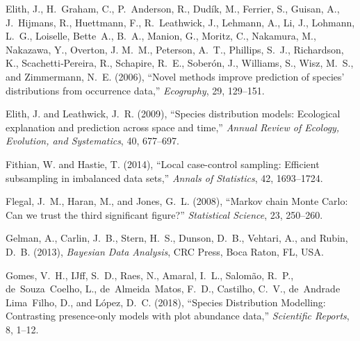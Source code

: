 \documentclass[11pt, titlepage]{article}
\begin{document}
\begin{spacing}{1.9}
\begin{flushleft}
\begin{thebibliography}{59}
Elith, J., H.~Graham, C., P.~Anderson, R., Dudík, M., Ferrier, S., Guisan, A.,
  J.~Hijmans, R., Huettmann, F., R.~Leathwick, J., Lehmann, A., Li, J.,
  Lohmann, L.~G., Loiselle, Bette~A., B.~A., Manion, G., Moritz, C., Nakamura,
  M., Nakazawa, Y., Overton, J. M.~M., Peterson, A.~T., Phillips, S.~J.,
  Richardson, K., Scachetti‐Pereira, R., Schapire, R.~E., Soberón, J.,
  Williams, S., Wisz, M.~S., and Zimmermann, N.~E. (2006), \enquote{Novel
  methods improve prediction of species’ distributions from occurrence data,}
  \textit{Ecography}, 29, 129--151.

Elith, J. and Leathwick, J.~R. (2009), \enquote{Species distribution models:
  {Ecological} explanation and prediction across space and time,}
  \textit{Annual Review of Ecology, Evolution, and Systematics}, 40, 677--697.

Fithian, W. and Hastie, T. (2014), \enquote{Local case-control sampling:
  {Efficient} subsampling in imbalanced data sets,} \textit{Annals of
  Statistics}, 42, 1693--1724.

Flegal, J.~M., Haran, M., and Jones, G.~L. (2008), \enquote{Markov chain
  {Monte} {Carlo}: {Can} we trust the third significant figure?}
  \textit{Statistical Science}, 23, 250--260.

Gelman, A., Carlin, J.~B., Stern, H.~S., Dunson, D.~B., Vehtari, A., and Rubin,
  D.~B. (2013), \textit{Bayesian {Data} {Analysis}}, CRC Press, Boca Raton, FL,
  USA.

Gomes, V.~H., IJff, S.~D., Raes, N., Amaral, I.~L., Salomão, R.~P.,
  de~Souza~Coelho, L., de~Almeida~Matos, F.~D., Castilho, C.~V., de~Andrade
  Lima~Filho, D., and López, D.~C. (2018), \enquote{Species {Distribution}
  {Modelling}: {Contrasting} presence-only models with plot abundance data,}
  \textit{Scientific Reports}, 8, 1--12.


\end{thebibliography}
\end{flushleft}
\end{spacing}
\end{document}
